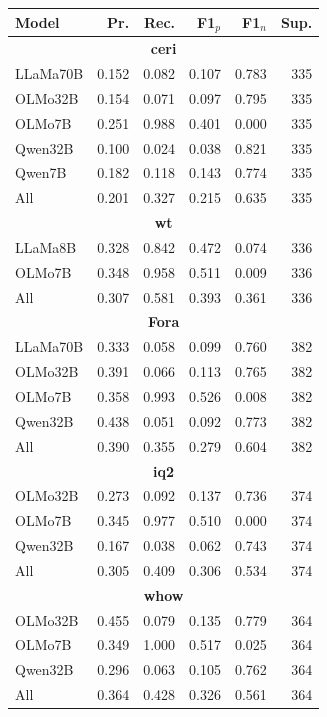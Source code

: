 \documentclass[11pt]{article}
\theoremstyle{definition}
\theoremstyle{plain}
\begin{document}
\begin{table}[ht]
	\centering
	\scriptsize
	\begin{tabular}{lrrrrr}
		\toprule
		Model & Pr. & Rec. & F1$_p$ & F1$_n$ & Sup.\\
		\midrule
		
		\multicolumn{6}{c}{\textbf{\ac{ceri}}} \\
		\midrule
		LLaMa70B & 0.152 & 0.082 & 0.107 & 0.783 & 335 \\
		OLMo32B  & 0.154 & 0.071 & 0.097 & 0.795 & 335 \\
		OLMo7B   & 0.251 & 0.988 & 0.401 & 0.000 & 335 \\
		Qwen32B  & 0.100 & 0.024 & 0.038 & 0.821 & 335 \\
		Qwen7B   & 0.182 & 0.118 & 0.143 & 0.774 & 335 \\
		{All} & {0.201} & {0.327} & {0.215} & {0.635} & {335} \\
		
		\midrule
		\multicolumn{6}{c}{\textbf{\ac{wt}}} \\
		\midrule
		LLaMa8B  & 0.328 & 0.842 & 0.472 & 0.074 & 336 \\
		OLMo7B   & 0.348 & 0.958 & 0.511 & 0.009 & 336 \\
		{All} & {0.307} & {0.581} & {0.393} & {0.361} & {336} \\
		
		\midrule
		\multicolumn{6}{c}{\textbf{Fora}} \\
		\midrule
		LLaMa70B & 0.333 & 0.058 & 0.099 & 0.760 & 382 \\
		OLMo32B  & 0.391 & 0.066 & 0.113 & 0.765 & 382 \\
		OLMo7B   & 0.358 & 0.993 & 0.526 & 0.008 & 382 \\
		Qwen32B  & 0.438 & 0.051 & 0.092 & 0.773 & 382 \\
		{All} & {0.390} & {0.355} & {0.279} & {0.604} & {382} \\
		
		\midrule
		\multicolumn{6}{c}{\textbf{\ac{iq2}}} \\
		\midrule
		OLMo32B  & 0.273 & 0.092 & 0.137 & 0.736 & 374 \\
		OLMo7B   & 0.345 & 0.977 & 0.510 & 0.000 & 374 \\
		Qwen32B  & 0.167 & 0.038 & 0.062 & 0.743 & 374 \\
		{All} & {0.305} & {0.409} & {0.306} & {0.534} & {374} \\
		
		\midrule
		\multicolumn{6}{c}{\textbf{\ac{whow}}} \\
		\midrule
		OLMo32B  & 0.455 & 0.079 & 0.135 & 0.779 & 364 \\
		OLMo7B   & 0.349 & 1.000 & 0.517 & 0.025 & 364 \\
		Qwen32B  & 0.296 & 0.063 & 0.105 & 0.762 & 364 \\
		{All} & {0.364} & {0.428} & {0.326} & {0.561} & {364} \\
		

\end{tabular}
\end{table}
\end{document}
